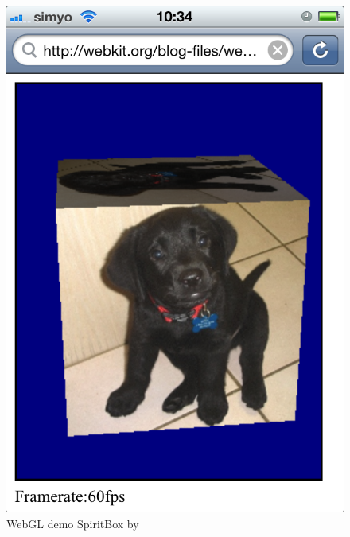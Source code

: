 \documentclass[12pt,journal,compsoc]{IEEEtran}
\begin{document}
\begin{figure}[htb]
	\centerline{\includegraphics[width=0.6\columnwidth]{grafiken/SpiritBox}}
	\caption{WebGL demo SpiritBox by \cite{SpiritBox}}
	\label{fig:spiritbox}
\end{figure}
\end{document}
